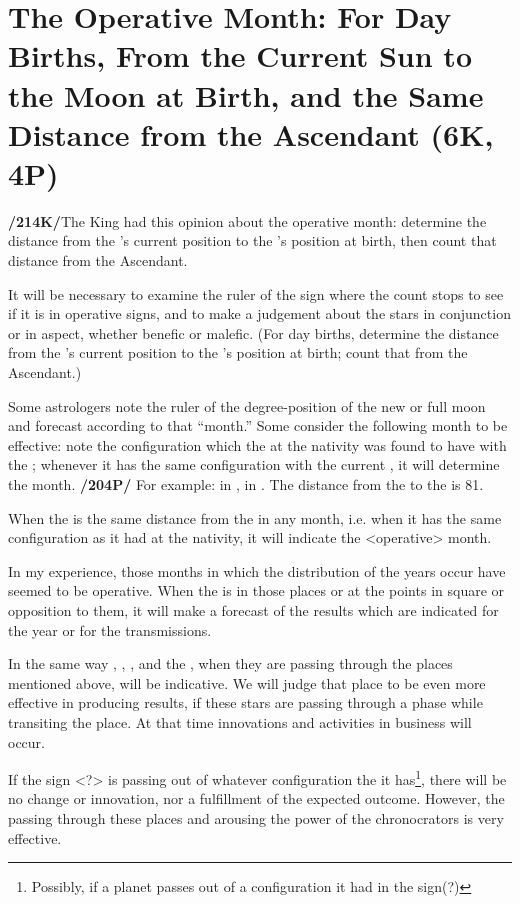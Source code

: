\section{The Operative Month: For Day Births, From the Current Sun to the Moon at Birth, and the Same Distance from the Ascendant (6K, 4P)}

\textbf{/214K/}The King had this opinion about the operative month: determine the distance from the \Sun’s current position to the \Moon’s position at birth, then count that distance from the Ascendant. 

It will be necessary to examine the ruler of the sign where the count stops to see if it is in operative signs, and to make a judgement about the stars in conjunction or in aspect, whether benefic or malefic. (For day births, determine the distance from the \Moon’s current position to the \Sun’s position at birth; count that from the Ascendant.)

Some astrologers note the ruler of the degree-position of the new or full moon and forecast according to that “month.” Some consider the following month to be effective: note the configuration which the \Moon\xspace at the nativity was found to have with the \Sun; whenever it has the same configuration with the current \Sun,
it will determine the month. \textbf{/204P/} For example: \Sun\xspace in \Leo\xspace 5\deg, \Moon\xspace in \Libra\xspace 2\deg. The distance from
the \Sun\xspace to the \Moon\xspace is 81\deg. 

When the \Moon\xspace is the same distance from the \Sun\xspace in any month, i.e. when it has the same configuration as it had at the nativity, it will indicate the <operative> month.

In my experience, those months in which the distribution of the years occur have seemed to be operative. When the \Sun\xspace is in those places or at the points in square or opposition to them, it will make a
forecast of the results which are indicated for the year or for the transmissions. 

In the same way \Mars, \Venus, \Mercury, and the \Moon, when they are passing through the places mentioned above, will be indicative. We will judge that place to be even more effective in producing results, if these stars are passing through a phase while transiting the place. At that time innovations and activities in business will occur. 

If the sign <?> is passing out of whatever configuration the it has\footnote{Possibly, if a planet passes out of a configuration it had in the sign(?)}, there will be no change or innovation, nor a fulfillment of the expected outcome. However, the \Sun\xspace passing through these places and
arousing the power of the chronocrators is very effective.



\newpage